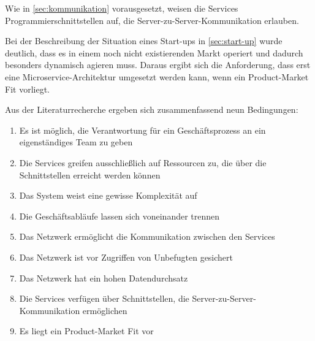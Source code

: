 Wie in \cref{sec:kommunikation} vorausgesetzt, weisen die Services Programmierschnittstellen auf, die Server-zu-Server-Kommunikation erlauben.

Bei der Beschreibung der Situation eines Start-ups in \cref{sec:start-up} wurde deutlich, dass es in einem noch nicht existierenden Markt operiert und dadurch besonders dynamisch agieren muss. Daraus ergibt sich die Anforderung, dass erst eine Microservice-Architektur umgesetzt werden kann, wenn ein Product-Market Fit vorliegt.

Aus der Literaturrecherche ergeben sich zusammenfassend neun Bedingungen:
\begin{enumerate}
	\item Es ist möglich, die Verantwortung für ein Geschäftsprozess an ein eigenständiges Team zu geben
	\item Die Services greifen ausschließlich auf Ressourcen zu, die über die Schnittstellen erreicht werden können
	\item Das System weist eine gewisse Komplexität auf
	\item Die Geschäftsabläufe lassen sich voneinander trennen
	\item Das Netzwerk ermöglicht die Kommunikation zwischen den Services
	\item Das Netzwerk ist vor Zugriffen von Unbefugten gesichert
	\item Das Netzwerk hat ein hohen Datendurchsatz
	\item Die Services verfügen über Schnittstellen, die Server-zu-Server-Kommunikation ermöglichen
	\item Es liegt ein Product-Market Fit vor
\end{enumerate}